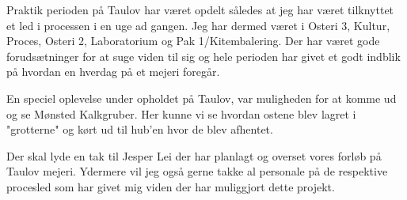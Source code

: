Praktik perioden på Taulov har været opdelt således at jeg har været tilknyttet et led i processen i en uge ad gangen. Jeg har dermed været i Osteri 3, Kultur, Proces, Osteri 2, Laboratorium og Pak 1/Kitembalering. 
Der har været gode forudsætninger for at suge viden til sig og hele perioden har givet et godt indblik på hvordan en hverdag på et mejeri foregår. 


En speciel oplevelse under opholdet på Taulov, var muligheden for at komme ud og se Mønsted Kalkgruber. Her kunne vi se hvordan ostene blev lagret i "grotterne" og kørt ud til hub'en hvor de blev afhentet. 

Der skal lyde en tak til Jesper Lei der har planlagt og overset vores forløb på Taulov mejeri. Ydermere vil jeg også gerne takke al personale på de respektive procesled som har givet mig viden der har muliggjort dette projekt. 